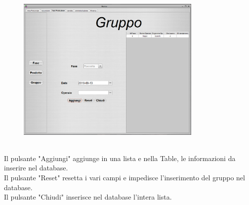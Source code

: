 \documentclass{article}
\begin{document}
\begin{itemize}
\begin{figure}[htbp]
\includegraphics[width=0.8\textwidth]{img/panel_group.png}
\end{figure}\\
Il pulsante "Aggiungi" aggiunge in una lista e nella Table, le informazioni da inserire nel database.\\
Il pulsante "Reset"  resetta i vari campi e impedisce l'inserimento del gruppo nel database.\\
Il pulsante "Chiudi" inserisce nel database l'intera lista.\\
\end{itemize}
\newpage
\end{document}
